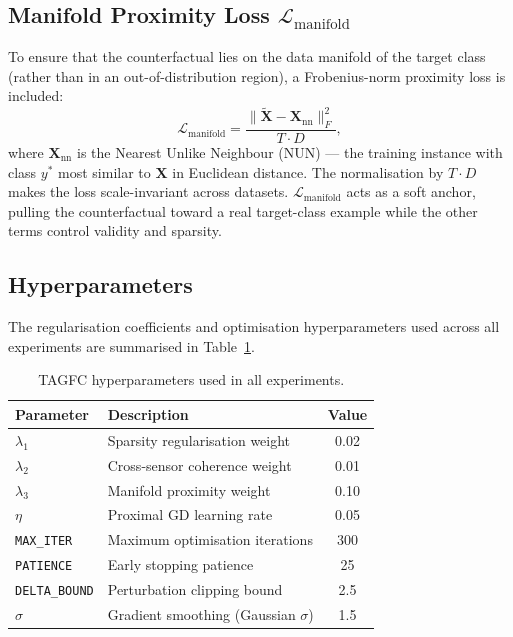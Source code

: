 \subsection{Manifold Proximity Loss $\mathcal{L}_{\text{manifold}}$}

To ensure that the counterfactual lies on the data manifold of the target class (rather than in an out-of-distribution region), a Frobenius-norm proximity loss is included:
\begin{equation}
    \mathcal{L}_{\text{manifold}} = \frac{\|\widetilde{\mathbf{X}} - \mathbf{X}_{\text{nn}}\|_F^2}{T \cdot D},
\end{equation}
where $\mathbf{X}_{\text{nn}}$ is the Nearest Unlike Neighbour (NUN) — the training instance with class $y^*$ most similar to $\mathbf{X}$ in Euclidean distance. The normalisation by $T \cdot D$ makes the loss scale-invariant across datasets. $\mathcal{L}_{\text{manifold}}$ acts as a soft anchor, pulling the counterfactual toward a real target-class example while the other terms control validity and sparsity.

\subsection{Hyperparameters}

The regularisation coefficients and optimisation hyperparameters used across all experiments are summarised in Table~\ref{tab:hyperparams}.

\begin{table}[htbp]
\centering
\caption{TAGFC hyperparameters used in all experiments.}
\label{tab:hyperparams}
\begin{tabular}{llc}
\toprule
\textbf{Parameter} & \textbf{Description} & \textbf{Value} \\
\midrule
$\lambda_1$ & Sparsity regularisation weight        & 0.02  \\
$\lambda_2$ & Cross-sensor coherence weight         & 0.01  \\
$\lambda_3$ & Manifold proximity weight             & 0.10  \\
$\eta$      & Proximal GD learning rate             & 0.05  \\
\texttt{MAX\_ITER}    & Maximum optimisation iterations & 300   \\
\texttt{PATIENCE}     & Early stopping patience         & 25    \\
\texttt{DELTA\_BOUND} & Perturbation clipping bound     & 2.5   \\
$\sigma$    & Gradient smoothing (Gaussian $\sigma$) & 1.5  \\
\bottomrule
\end{tabular}
\end{table}

